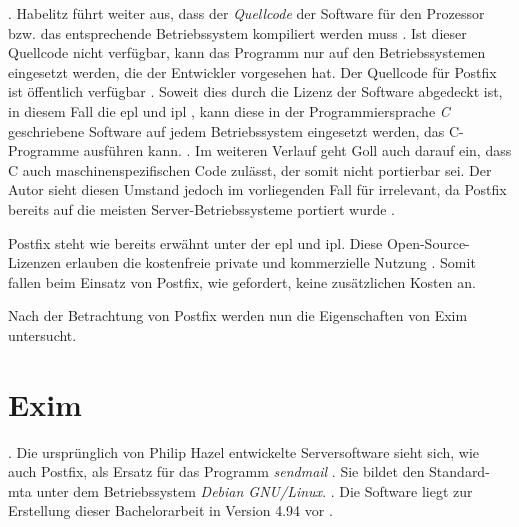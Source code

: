  \citep[][26]{Habelitz2016}.
Habelitz führt weiter aus, dass der \textit{Quellcode} der Software für den Prozessor bzw. das entsprechende Betriebssystem kompiliert werden muss \citep[vgl.][27]{Habelitz2016}. 
Ist dieser Quellcode nicht verfügbar, kann das Programm nur auf den Betriebssystemen eingesetzt werden, die der Entwickler vorgesehen hat. 
Der Quellcode für Postfix ist öffentlich verfügbar \citep[vgl.][]{postfixsource}. 
Soweit dies durch die Lizenz der Software abgedeckt ist, in diesem Fall die \ac{epl} und \ac{ipl} \citep[vgl.][]{postfixsource}, kann diese in der Programmiersprache \textit{C} geschriebene Software auf jedem Betriebssystem eingesetzt werden, das C-Programme ausführen kann.
 \citep[][6]{Goll2014}. Im weiteren Verlauf geht Goll auch darauf ein, dass C auch maschinenspezifischen Code zulässt, der somit nicht portierbar sei. Der Autor sieht diesen Umstand jedoch im vorliegenden Fall für irrelevant, da Postfix bereits auf die meisten Server-Betriebssysteme portiert wurde \citep[vgl.][]{postfixpackages}.

Postfix steht wie bereits erwähnt unter der \ac{epl} und \ac{ipl}. Diese Open-Source-Lizenzen erlauben die kostenfreie private und kommerzielle Nutzung \citep[vgl.][]{postfixlizenz}. Somit fallen beim Einsatz von Postfix, wie gefordert, keine zusätzlichen Kosten an.

Nach der Betrachtung von Postfix werden nun die Eigenschaften von Exim untersucht.

\section{Exim}

 \citep[][]{eximhome}. Die ursprünglich von Philip Hazel entwickelte Serversoftware sieht sich, wie auch Postfix, als Ersatz für das Programm \textit{sendmail} \citep[vgl.][]{eximhome}. Sie bildet den Standard-\ac{mta} unter dem Betriebssystem \textit{Debian GNU/Linux}.  \citep[][]{debianwiki}. Die Software liegt zur Erstellung dieser Bachelorarbeit in Version 4.94 vor \citep[vgl.][]{eximgit}.

